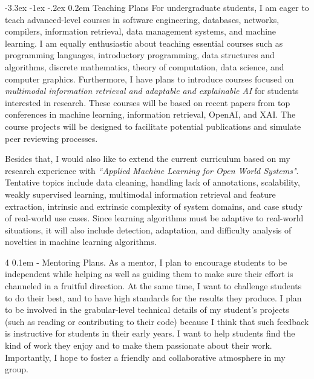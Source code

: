 \documentclass[10pt]{article}
\makeatletter
\def \section {%
    \@startsection {section}
    {1}%
    {\z@}%
    {-3.3ex \@plus -1ex \@minus -.2ex}%
    {0.2em}
    {\normalfont \Large \scshape \bfseries} %
    }
\def \paragraph {%
    \@startsection{paragraph}%
        {4}%
        \z@%
        {0.1em}
        {-\fontdimen 6 \font}%
        {\normalfont \bfseries}%
    }
\makeatother
\begin{document}

\section{Teaching Plans}
For undergraduate students, I am eager to teach advanced-level courses in software engineering, databases, networks, compilers, information retrieval, data management systems, and machine learning. I am equally enthusiastic about teaching essential courses such as programming languages, introductory programming, data structures and algorithms, discrete mathematics, theory of computation, data science, and computer graphics. Furthermore, I have plans to introduce courses focused on \textit{multimodal information retrieval and adaptable and explainable AI} for students interested in research. These courses will be based on recent papers from top conferences in machine learning, information retrieval, OpenAI, and XAI. The course projects will be designed to facilitate potential publications and simulate peer reviewing processes.
%

Besides that, I would also like to extend the current curriculum based on my research experience with \textit{``Applied Machine Learning for Open World Systems"}. Tentative topics include data cleaning, handling lack of annotations, scalability, weakly supervised learning, multimodal information retrieval and feature extraction, intrinsic and extrinsic complexity of system domains, and case study of real-world use cases. Since learning algorithms must be adaptive to real-world situations, it will also include detection, adaptation, and difficulty analysis of novelties in machine learning algorithms.


\paragraph{Mentoring Plans.}
As a mentor, I plan to encourage students to be independent while helping as well as guiding them to make sure their effort is channeled in a fruitful direction. At the same time, I want to challenge students to do their best, and to have high standards for the results they produce. I plan to be involved in the grabular-level technical details of my student’s projects (such as reading or contributing to their code) because I think that such feedback is instructive for students in their early years. I want to help students find the kind of work they enjoy and to make them passionate about their work. Importantly, I hope to foster a friendly and collaborative atmosphere in my group.
\end{document}
